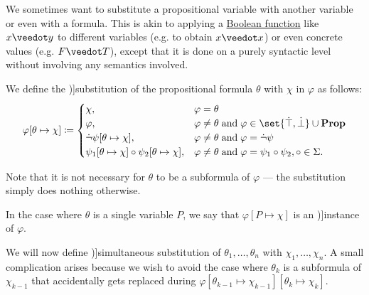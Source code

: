 \begin{definition}\label{def:propositional_substitution}
  We sometimes want to substitute a propositional variable with another variable or even with a formula. This is akin to applying a \hyperref[def:boolean_function]{Boolean function} like \( x \synvee y \) to different variables (e.g. to obtain \( x \synvee x \)) or even concrete values (e.g. \( F \synvee T \)), except that it is done on a purely syntactic level without involving any semantics involved.

  \begin{thmenum}
     We define the \term[ru=подстановка (\cite[66]{КолмогоровДрагалин2006})]{substitution} of the propositional formula \( \theta \) with \( \chi \) in \( \varphi \) as follows:
    \begin{equation}\label{eq:def:propositional_substitution/single}
      \varphi[\theta \mapsto \chi] \coloneqq \begin{cases}
        \chi,                                                             &\varphi = \theta \\
        \varphi,                                                          &\varphi \neq \theta \T{and} \varphi \in \set{ \syntop, \synbot } \cup \boldop{Prop} \\
        \synneg \psi[\theta \mapsto \chi],                                &\varphi \neq \theta \T{and} \varphi = \synneg \psi \\
        \psi_1[\theta \mapsto \chi] \bincirc \psi_2[\theta \mapsto \chi], &\varphi \neq \theta \T{and} \varphi = \psi_1 \bincirc \psi_2, \circ \in \Sigma.
      \end{cases}
    \end{equation}

    Note that it is not necessary for \( \theta \) to be a subformula of \( \varphi \) --- the substitution simply does nothing otherwise.

    In the case where \( \theta \) is a single variable \( P \), we say that \( \varphi[P \mapsto \chi] \) is an \term[en=substitution instance (\cite[67]{VanDalen2004})]{instance} of \( \varphi \).

    \mimprovised We will now define \term[en=simultaneous substitution (\cite[exer. 2.2.50]{Hinman2005})]{simultaneous substitution} of \( \theta_1, \ldots, \theta_n \) with \( \chi_1, \ldots, \chi_n \). A small complication arises because we wish to avoid the case where \( \theta_k \) is a subformula of \( \chi_{k-1} \) that accidentally gets replaced during \( \varphi[\theta_{k-1} \mapsto \chi_{k-1}][\theta_k \mapsto \chi_k] \).


\end{thmenum}
\end{definition}
